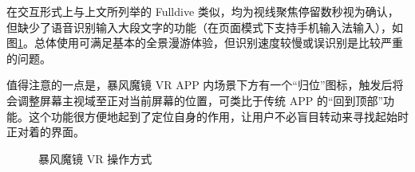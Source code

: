 在交互形式上与上文所列举的 Fulldive 类似，均为视线聚焦停留数秒视为确认，但缺少了语音识别输入大段文字的功能（在页面模式下支持手机输入法输入），如图\ref{fig:storm}。总体使用可满足基本的全景漫游体验，但识别速度较慢或误识别是比较严重的问题。

值得注意的一点是，暴风魔镜 VR APP 内场景下方有一个“归位”图标，触发后将会调整屏幕主视域至正对当前屏幕的位置，可类比于传统 APP 的“回到顶部”功能。这个功能很方便地起到了定位自身的作用，让用户不必盲目转动来寻找起始时正对着的界面。


\begin{figure}[htp]
\centering
{}
\caption{暴风魔镜 VR 操作方式}
\label{fig:storm}
\end{figure}

